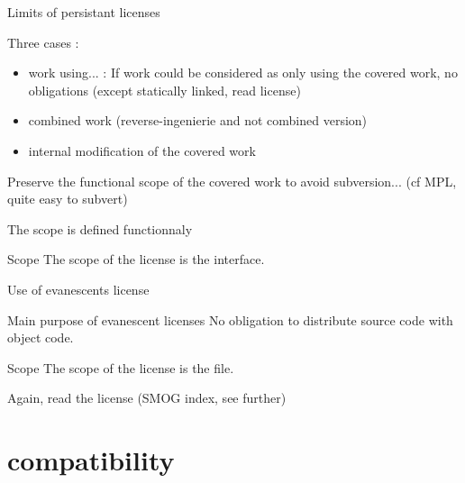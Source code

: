 \documentclass{beamer}
\begin{document}
\begin{frame}{Limits of persistant licenses}

Three cases :

  \begin{itemize}
  \item work using... : If work could be considered as only using the covered work, no obligations (except statically linked, read license)
  \item combined work (reverse-ingenierie and not combined version)
  \item internal modification of the covered work
  \end{itemize}

Preserve the functional scope of the covered work to avoid subversion... (cf MPL, quite easy to subvert)

The scope is defined functionnaly

 \begin{alertblock}{Scope}
 	The scope of the license is the interface.
  \end{alertblock}
  
\end{frame}

\begin{frame}{Use of evanescents license}

  \begin{block}{Main purpose of evanescent licenses}
    No obligation to distribute source code with object code.
  \end{block}

  \begin{alertblock}{Scope}
 	The scope of the license is the file.
  \end{alertblock}

 Again, read the license (SMOG index, see further)
\end{frame}


\section{compatibility}
\end{document}
